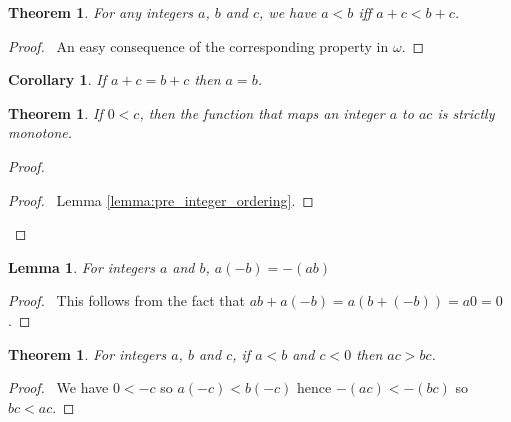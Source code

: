 \documentclass{article}
\let\qed\relax
\newtheorem{lemma}[axiom]{Lemma}
\newtheorem{theorem}[axiom]{Theorem}
\newtheorem{corollary}{Corollary}[axiom]
\theoremstyle{definition}
\begin{document}
    \begin{theorem}
        For any integers $a$, $b$ and $c$, we have $a < b$ iff $a + c < b + c$.
    \end{theorem}

    \begin{proof}
        \pf\ An easy consequence of the corresponding property in $\omega$.
    \end{proof}

    \begin{corollary}
        If $a + c = b + c$ then $a = b$.
    \end{corollary}

    \begin{theorem}
        If $0 < c$, then the function that maps an integer $a$ to $ac$ is strictly monotone.
    \end{theorem}

    \begin{proof}
        \pf
        \begin{proof}
            \pf\ Lemma \ref{lemma:pre_integer_ordering}.
        \end{proof}
        \qed
    \end{proof}

    \begin{lemma}
        For integers $a$ and $b$,
        $a(-b) = -(ab)$
    \end{lemma}

    \begin{proof}
        \pf\ This follows from the fact that $ab + a(-b) = a(b + (-b)) = a0 = 0$. \qed
    \end{proof}

    \begin{theorem}
        For integers $a$, $b$ and $c$, if $a < b$ and $c < 0$ then $ac > bc$.
    \end{theorem}

    \begin{proof}
        \pf\ We have $0 < -c$ so $a(-c) < b(-c)$ hence $-(ac) < -(bc)$ so $bc < ac$. \qed
    \end{proof}
\end{document}
